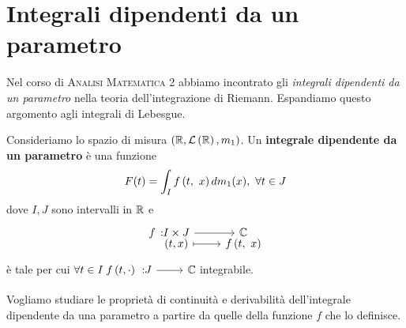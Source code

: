 \section{Integrali dipendenti da un parametro}
Nel corso di \textsc{Analisi Matematica 2} abbiamo incontrato gli \textit{integrali dipendenti da un parametro} nella teoria dell'integrazione di Riemann. Espandiamo questo argomento agli integrali di Lebesgue.
\begin{define}
	Consideriamo lo spazio di misura $\left(\mathbb{R},\mathcal{L}\left(\mathbb{R}\right),m_1\right)$. Un \textbf{integrale dipendente da un parametro} è una funzione
	\begin{equation}
		F(t)=\int_If\left(t,\ x\right)dm_1(x),\ \forall t\in J
	\end{equation}
	dove $I,J$ sono intervalli in $\mathbb{R}$ e
	\begin{equation*}
		\funztot{f}{I\times J}{\complexset}{\left(t,x\right)}{\mvf{f}{t}{x}}
	\end{equation*}
	è tale per cui $\forall t\in I\ \funz{f\left(t,\cdot\right)}{J}{\complexset}$ integrabile.
\end{define}
Vogliamo studiare le proprietà di continuità e derivabilità dell'integrale dipendente da una parametro a partire da quelle della funzione $f$ che lo definisce.
